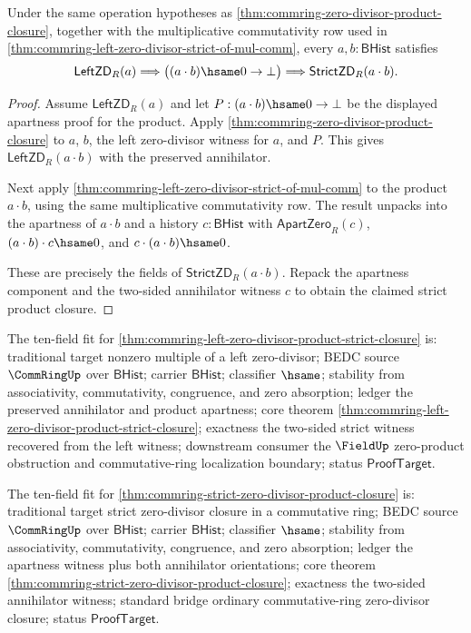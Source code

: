 \begin{theorem}
\label{thm:commring-left-zero-divisor-product-strict-closure}
Under the same operation hypotheses as
\autoref{thm:commring-zero-divisor-product-closure}, together with the
multiplicative commutativity row used in
\autoref{thm:commring-left-zero-divisor-strict-of-mul-comm}, every
$a,b:\mathsf{BHist}$ satisfies
$$
\mathsf{LeftZD}_R(a)
\Longrightarrow
\bigl((a\cdot b)\hsame0\to\bot\bigr)
\Longrightarrow
\mathsf{StrictZD}_R(a\cdot b).
$$
\end{theorem}
\begin{proof}
Assume $\mathsf{LeftZD}_R(a)$ and let $P:(a\cdot b)\hsame0\to\bot$ be the
displayed apartness proof for the product. Apply
\autoref{thm:commring-zero-divisor-product-closure} to $a$, $b$, the left
zero-divisor witness for $a$, and $P$. This gives
$\mathsf{LeftZD}_R(a\cdot b)$ with the preserved annihilator.

Next apply \autoref{thm:commring-left-zero-divisor-strict-of-mul-comm} to the
product $a\cdot b$, using the same multiplicative commutativity row. The result
unpacks into the apartness of $a\cdot b$ and a history
$c:\mathsf{BHist}$ with $\mathsf{ApartZero}_R(c)$,
$(a\cdot b)\cdot c\hsame0$, and $c\cdot(a\cdot b)\hsame0$.

These are precisely the fields of $\mathsf{StrictZD}_R(a\cdot b)$. Repack the
apartness component and the two-sided annihilator witness $c$ to obtain the
claimed strict product closure.
\end{proof}
The ten-field fit for
\autoref{thm:commring-left-zero-divisor-product-strict-closure} is:
traditional target nonzero multiple of a left zero-divisor; BEDC source
$\CommRingUp$ over $\mathsf{BHist}$; carrier $\mathsf{BHist}$; classifier
$\hsame$; stability from associativity, commutativity, congruence, and zero
absorption; ledger the preserved annihilator and product apartness; core theorem
\autoref{thm:commring-left-zero-divisor-product-strict-closure}; exactness the
two-sided strict witness recovered from the left witness; downstream consumer
the $\FieldUp$ zero-product obstruction and commutative-ring localization
boundary; status $\mathsf{ProofTarget}$.

The ten-field fit for
\autoref{thm:commring-strict-zero-divisor-product-closure} is: traditional
target strict zero-divisor closure in a
commutative ring; BEDC source $\CommRingUp$ over $\mathsf{BHist}$; carrier
$\mathsf{BHist}$; classifier $\hsame$; stability from associativity,
commutativity, congruence, and zero absorption; ledger the apartness witness
plus both annihilator orientations; core theorem
\autoref{thm:commring-strict-zero-divisor-product-closure}; exactness the
two-sided annihilator witness; standard bridge ordinary commutative-ring
zero-divisor closure; status $\mathsf{ProofTarget}$.

